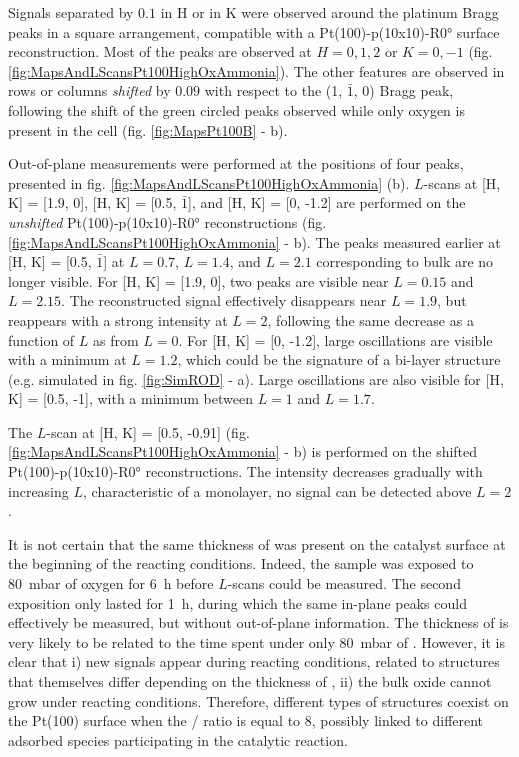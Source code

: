 Signals separated by $0.1$ in H or in K were observed around the platinum Bragg peaks in a square arrangement, compatible with a Pt(100)-p(10x10)-R\ang{0} surface reconstruction.
Most of the peaks are observed at $H={0,1,2}$ or $K={0, -1}$ (fig. \ref{fig:MapsAndLScansPt100HighOxAmmonia}).
The other features are observed in rows or columns \textit{shifted} by $0.09$ with respect to the (1, $\bar{1}$, 0) Bragg peak, following the shift of the green circled peaks observed while only oxygen is present in the cell (fig. \ref{fig:MapsPt100B} - b).

Out-of-plane measurements were performed at the positions of four peaks, presented in fig. \ref{fig:MapsAndLScansPt100HighOxAmmonia} (b).
$L$-scans at [H, K] = [1.9, 0], [H, K] = [0.5,  $\bar{1}$], and [H, K] = [0, -1.2] are performed on the \textit{unshifted} Pt(100)-p(10x10)-R\ang{0} reconstructions (fig. \ref{fig:MapsAndLScansPt100HighOxAmmonia} - b).
The peaks measured earlier at [H, K] = [0.5, $\bar{1}$] at $L=0.7$, $L=1.4$, and $L=2.1$ corresponding to bulk  are no longer visible.
For [H, K] = [1.9, 0], two peaks are visible near $L=0.15$ and $L=2.15$.
The reconstructed signal effectively disappears near $L=1.9$, but reappears with a strong intensity at $L=2$, following the same decrease as a function of $L$ as from $L=0$.
For [H, K] = [0, -1.2], large oscillations are visible with a minimum at $L=1.2$, which could be the signature of a bi-layer structure (e.g. simulated  in fig. \ref{fig:SimROD} - a).
Large oscillations are also visible for [H, K] = [0.5, -1], with a minimum between $L=1$ and $L=1.7$.

The $L$-scan at [H, K] = [0.5, -0.91] (fig. \ref{fig:MapsAndLScansPt100HighOxAmmonia} - b) is performed on the shifted Pt(100)-p(10x10)-R\ang{0} reconstructions.
The intensity decreases gradually with increasing $L$, characteristic of a monolayer, no signal can be detected above $L=2$.

It is not certain that the same thickness of  was present on the catalyst surface at the beginning of the reacting conditions.
Indeed, the sample was exposed to \qty{80}{\milli\bar} of oxygen for \qty{6}{\hour} before $L$-scans could be measured.
The second exposition only lasted for \qty{1}{\hour}, during which the same in-plane peaks could effectively be measured, but without out-of-plane information.
The thickness of  is very likely to be related to the time spent under only \qty{80}{\milli\bar} of .
However, it is clear that i) new signals appear during reacting conditions, related to structures that themselves differ depending on the thickness of , ii) the bulk oxide cannot grow under reacting conditions.
Therefore, different types of structures coexist on the Pt(100) surface when the / ratio is equal to \num{8}, possibly linked to different adsorbed species participating in the catalytic reaction.

